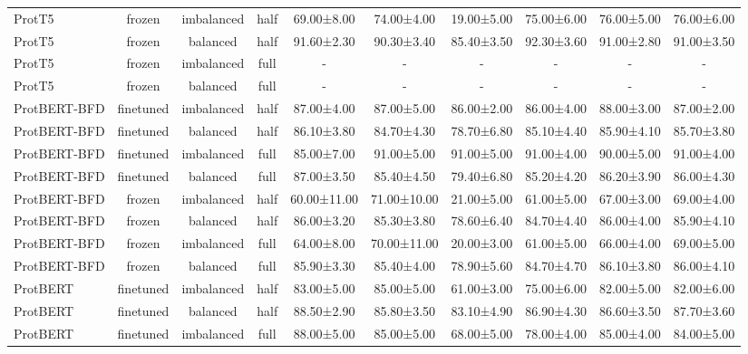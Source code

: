 \begin{tabular}{lccccccccc}
      ProtT5 &         frozen & imbalanced &      half &  69.00±8.00 &  74.00±4.00 & 19.00±5.00 & 75.00±6.00 &  76.00±5.00 &  76.00±6.00 \\
      ProtT5 &         frozen &   balanced &      half &  91.60±2.30 &  90.30±3.40 & 85.40±3.50 & 92.30±3.60 &  91.00±2.80 &  91.00±3.50 \\
      ProtT5 &         frozen & imbalanced &      full &           - &           - &          - &          - &           - &           - \\
      ProtT5 &         frozen &   balanced &      full &           - &           - &          - &          - &           - &           - \\
ProtBERT-BFD &      finetuned & imbalanced &      half &  87.00±4.00 &  87.00±5.00 & 86.00±2.00 & 86.00±4.00 &  88.00±3.00 &  87.00±2.00 \\
ProtBERT-BFD &      finetuned &   balanced &      half &  86.10±3.80 &  84.70±4.30 & 78.70±6.80 & 85.10±4.40 &  85.90±4.10 &  85.70±3.80 \\
ProtBERT-BFD &      finetuned & imbalanced &      full &  85.00±7.00 &  91.00±5.00 & 91.00±5.00 & 91.00±4.00 &  90.00±5.00 &  91.00±4.00 \\
ProtBERT-BFD &      finetuned &   balanced &      full &  87.00±3.50 &  85.40±4.50 & 79.40±6.80 & 85.20±4.20 &  86.20±3.90 &  86.00±4.30 \\
ProtBERT-BFD &         frozen & imbalanced &      half & 60.00±11.00 & 71.00±10.00 & 21.00±5.00 & 61.00±5.00 &  67.00±3.00 &  69.00±4.00 \\
ProtBERT-BFD &         frozen &   balanced &      half &  86.00±3.20 &  85.30±3.80 & 78.60±6.40 & 84.70±4.40 &  86.00±4.00 &  85.90±4.10 \\
ProtBERT-BFD &         frozen & imbalanced &      full &  64.00±8.00 & 70.00±11.00 & 20.00±3.00 & 61.00±5.00 &  66.00±4.00 &  69.00±5.00 \\
ProtBERT-BFD &         frozen &   balanced &      full &  85.90±3.30 &  85.40±4.00 & 78.90±5.60 & 84.70±4.70 &  86.10±3.80 &  86.00±4.10 \\
    ProtBERT &      finetuned & imbalanced &      half &  83.00±5.00 &  85.00±5.00 & 61.00±3.00 & 75.00±6.00 &  82.00±5.00 &  82.00±6.00 \\
    ProtBERT &      finetuned &   balanced &      half &  88.50±2.90 &  85.80±3.50 & 83.10±4.90 & 86.90±4.30 &  86.60±3.50 &  87.70±3.60 \\
    ProtBERT &      finetuned & imbalanced &      full &  88.00±5.00 &  85.00±5.00 & 68.00±5.00 & 78.00±4.00 &  85.00±4.00 &  84.00±5.00 \\

\end{tabular}
